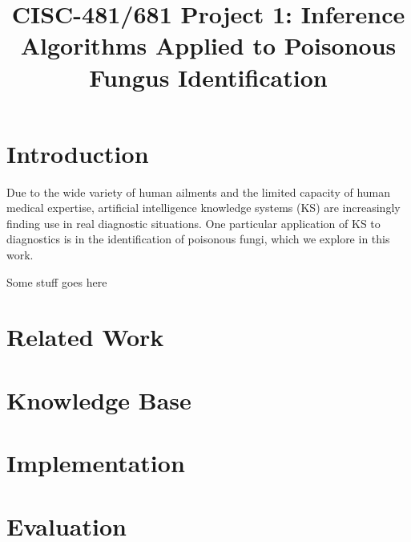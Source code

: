 \documentclass[12pt, conference, compsocconf]{IEEEtran}
\begin{document}
\title{CISC-481/681 Project 1: Inference Algorithms Applied to Poisonous Fungus Identification}

\author{ }

\maketitle

\section{Introduction}
Due to the wide variety of human ailments and the limited capacity of human medical expertise, artificial intelligence knowledge systems (KS) are increasingly finding use in real diagnostic situations. One particular application of KS to diagnostics is in the identification of poisonous fungi, which we explore in this work. 

Some stuff goes here ~\cite{russell-norvig-aima} ~\cite{python-doc} ~\cite{sympy-doc}

\section{Related Work}

\section{Knowledge Base}

\section{Implementation}

\section{Evaluation}




\end{document}
